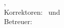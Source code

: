 \hfill
\vfill
{
	\small
	\textbf{\thesisName} \\
	\textit{\thesisTitle} \\
	\thesisSubject, \thesisDate\\ %
	Korrektoren: \thesisFirstReviewer\ und \thesisSecondReviewer\\ %
	Betreuer: \thesisSupervisor\\[1.5em] %
	\textbf{\thesisUniversity} \\
	\textit{\thesisUniversityGroup} \\
	\thesisUniversityInstitute\\ %
	\thesisUniversityDepartment\\ %
	\thesisUniversityStreetAddress\\ %
	\thesisUniversityPostalCode\ \thesisUniversityCity\
}
